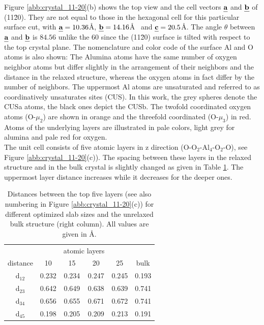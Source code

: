 \documentclass[11pt,DIV=13,BCOR=5mm,a4paper,headinclude]{scrbook}
\def\mathbi#1{\textbf{\em #1}}
\renewcommand{\vec}[1]{\mathbi{#1}}
\begin{document}
Figure \ref{abb:crystal_11-20}(b) shows the top view and the cell vectors $\vec{a}$ and $\vec{b}$ of (11\=20).
They are not equal to those in the hexagonal cell for this particular surface cut, with $\vec{a}=10.36$\AA, $\vec{b}=14.16$\AA~ and $\vec{c}=20.5$\AA.
The angle $\theta$ between $\vec{a}$ and $\vec{b}$ is $84.56$\textdegree{} unlike the $60$\textdegree{} since the (11\=20) surface is tilted with respect to the top crystal plane.
The nomenclature and color code of the surface Al and O atoms is also shown: The Alumina atoms have the same number of oxygen neighbor atoms but differ slightly in the arrangement of their neighbors and the distance in the relaxed structure, whereas the oxygen atoms in fact differ by the number of neighbors.
The uppermost Al atoms are unsaturated and referred to as coordinatively unsaturates sites (CUS).
In this work, the grey spheres denote the CUSa atoms, the black ones depict the CUSb.
The twofold coordinated oxygen atoms (O-$\mu_2$) are shown in orange and the threefold coordinated (O-$\mu_3$) in red.
Atoms of the underlying layers are illustrated in pale colors, light grey for alumina and pale red for oxygen.
\\
The unit cell consists of five atomic layers in z direction (O-O$_2$-Al$_4$-O$_2$-O), see Figure \ref{abb:crystal_11-20}(c)).
The spacing between these layers in the relaxed structure and in the bulk crystal is slightly changed as given in Table \ref{tab:layer-dist}.
The uppermost layer distance increases while it decreases for the deeper ones.
\begin{table}[!ht]
  \centering
 \caption{Distances between the top five layers (see also numbering in Figure \ref{abb:crystal_11-20}(c)) for different optimized slab sizes and the unrelaxed bulk structure (right column).
All values are given in \AA.} 
\vspace*{.2cm}
\begin{tabular}{c|cccc|c}
\toprule
 & &\multicolumn{2}{c}{atomic layers}&&\\
    distance    & 10   & 15   & 20   & 25   &bulk \\\midrule
 d$_{12}$	&0.232 &0.234 &0.247 &0.245 &0.193 \\
 d$_{23}$	&0.642 &0.649 &0.638 &0.639 &0.741 \\
 d$_{34}$	&0.656 &0.655 &0.671 &0.672 &0.741 \\
 d$_{45}$	&0.198 &0.205 &0.209 &0.213 &0.191 \\\bottomrule
  \end{tabular}
  \label{tab:layer-dist}
\end{table}
\end{document}
